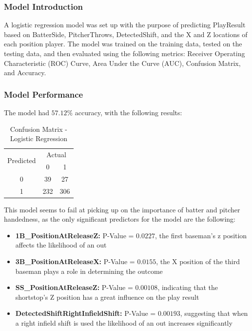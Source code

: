 \documentclass{article}
\begin{document}
\subsubsection{Model Introduction}
A logistic regression model was set up with the purpose of predicting PlayResult
based on BatterSide, PitcherThrows, DetectedShift, and the X and Z locations of each position player. The model was trained on the training data, tested on the testing data, and then evaluated using the following metrics: Receiver Operating Characteristic (ROC) Curve, Area Under the Curve (AUC), Confusion Matrix, and Accuracy. 

\subsubsection{Model Performance}
The model had $57.12\%$ accuracy, with the following results: 

\begin{table}[h!]
\centering
\begin{tabular}{|c|c|c|}
\hline
\multirow{2}{*}{Predicted} & \multicolumn{2}{c|}{Actual} \\ \cline{2-3} 
                           & 0   & 1   \\ \hline
0                          & 39  & 27  \\ \hline
1                          & 232 & 306 \\ \hline
\end{tabular}
\caption{Confusion Matrix - Logistic Regression}
\end{table}

This model seems to fail at picking up on the importance of batter and pitcher handedness, as the only significant predictors for the model are the following: 
\begin{itemize}
    \item \textbf{1B\_PositionAtReleaseZ:} P-Value = $0.0227$, the first baseman's z position affects the likelihood of an out
    \item \textbf{3B\_PositionAtReleaseX:} P-Value = $0.0155$, the X position of the third baseman plays a role in determining the outcome 
    \item \textbf{SS\_PositionAtReleaseZ:} P-Value = $0.00108$, indicating that the shortstop's Z position has a great influence on the play result 
    \item \textbf{DetectedShiftRightInfieldShift:} P-Value = $0.00193$, suggesting that when a right infield shift is used the likelihood of an out increases significantly 
\end{itemize}
\end{document}
